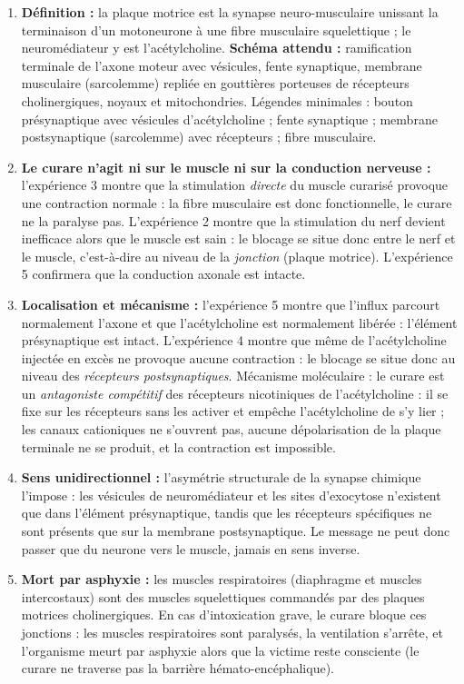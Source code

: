 \documentclass[11pt]{article}
\begin{document}
\begin{corrige}
\begin{enumerate}
\item \textbf{Définition :} la plaque motrice est la synapse neuro-musculaire unissant la terminaison d'un motoneurone à une fibre musculaire squelettique ; le neuromédiateur y est l'acétylcholine. \textbf{Schéma attendu :} ramification terminale de l'axone moteur avec vésicules, fente synaptique, membrane musculaire (sarcolemme) repliée en gouttières porteuses de récepteurs cholinergiques, noyaux et mitochondries. Légendes minimales : bouton présynaptique avec vésicules d'acétylcholine ; fente synaptique ; membrane postsynaptique (sarcolemme) avec récepteurs ; fibre musculaire.
\item \textbf{Le curare n'agit ni sur le muscle ni sur la conduction nerveuse :} l'expérience 3 montre que la stimulation \emph{directe} du muscle curarisé provoque une contraction normale : la fibre musculaire est donc fonctionnelle, le curare ne la paralyse pas. L'expérience 2 montre que la stimulation du nerf devient inefficace alors que le muscle est sain : le blocage se situe donc entre le nerf et le muscle, c'est-à-dire au niveau de la \emph{jonction} (plaque motrice). L'expérience 5 confirmera que la conduction axonale est intacte.
\item \textbf{Localisation et mécanisme :} l'expérience 5 montre que l'influx parcourt normalement l'axone et que l'acétylcholine est normalement libérée : l'élément présynaptique est intact. L'expérience 4 montre que même de l'acétylcholine injectée en excès ne provoque aucune contraction : le blocage se situe donc au niveau des \emph{récepteurs postsynaptiques}. Mécanisme moléculaire : le curare est un \emph{antagoniste compétitif} des récepteurs nicotiniques de l'acétylcholine : il se fixe sur les récepteurs sans les activer et empêche l'acétylcholine de s'y lier ; les canaux cationiques ne s'ouvrent pas, aucune dépolarisation de la plaque terminale ne se produit, et la contraction est impossible.
\item \textbf{Sens unidirectionnel :} l'asymétrie structurale de la synapse chimique l'impose : les vésicules de neuromédiateur et les sites d'exocytose n'existent que dans l'élément présynaptique, tandis que les récepteurs spécifiques ne sont présents que sur la membrane postsynaptique. Le message ne peut donc passer que du neurone vers le muscle, jamais en sens inverse.
\item \textbf{Mort par asphyxie :} les muscles respiratoires (diaphragme et muscles intercostaux) sont des muscles squelettiques commandés par des plaques motrices cholinergiques. En cas d'intoxication grave, le curare bloque ces jonctions : les muscles respiratoires sont paralysés, la ventilation s'arrête, et l'organisme meurt par asphyxie alors que la victime reste consciente (le curare ne traverse pas la barrière hémato-encéphalique).

\end{enumerate}
\end{corrige}
\end{document}
